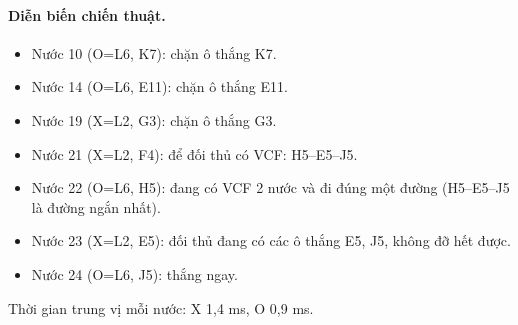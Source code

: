 \paragraph{Diễn biến chiến thuật.}
\begin{itemize}\small
\setlength{\itemsep}{0pt}
  \item Nước 10 (O=L6, K7): chặn ô thắng K7.
  \item Nước 14 (O=L6, E11): chặn ô thắng E11.
  \item Nước 19 (X=L2, G3): chặn ô thắng G3.
  \item Nước 21 (X=L2, F4): để đối thủ có VCF: H5--E5--J5.
  \item Nước 22 (O=L6, H5): đang có VCF 2 nước và đi đúng một đường (H5--E5--J5 là đường ngắn nhất).
  \item Nước 23 (X=L2, E5): đối thủ đang có các ô thắng E5, J5, không đỡ hết được.
  \item Nước 24 (O=L6, J5): thắng ngay.
\end{itemize}
Thời gian trung vị mỗi nước: X 1,4 ms, O 0,9 ms.
\clearpage

